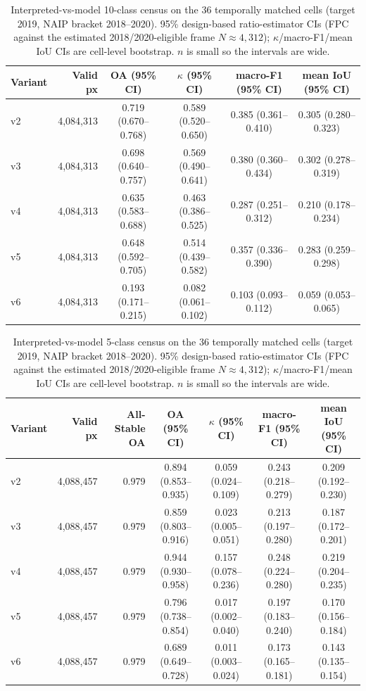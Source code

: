 \begin{table}[t]
\centering
\caption{Interpreted-vs-model 10-class census on the 36 temporally matched cells (target 2019, NAIP bracket 2018--2020). 95\% design-based ratio-estimator CIs (FPC against the estimated 2018/2020-eligible frame $N\approx4{,}312$); $\kappa$/macro-F1/mean IoU CIs are cell-level bootstrap. $n$ is small so the intervals are wide.}
\label{tab:model2019_10class}
\begin{tabular}{lrcccc}
\toprule
Variant & Valid px & OA (95\% CI) & $\kappa$ (95\% CI) & macro-F1 (95\% CI) & mean IoU (95\% CI) \\
\midrule
v2 & 4,084,313 & 0.719 (0.670--0.768) & 0.589 (0.520--0.650) & 0.385 (0.361--0.410) & 0.305 (0.280--0.323) \\
v3 & 4,084,313 & 0.698 (0.640--0.757) & 0.569 (0.490--0.641) & 0.380 (0.360--0.434) & 0.302 (0.278--0.319) \\
v4 & 4,084,313 & 0.635 (0.583--0.688) & 0.463 (0.386--0.525) & 0.287 (0.251--0.312) & 0.210 (0.178--0.234) \\
v5 & 4,084,313 & 0.648 (0.592--0.705) & 0.514 (0.439--0.582) & 0.357 (0.336--0.390) & 0.283 (0.259--0.298) \\
v6 & 4,084,313 & 0.193 (0.171--0.215) & 0.082 (0.061--0.102) & 0.103 (0.093--0.112) & 0.059 (0.053--0.065) \\
\bottomrule
\end{tabular}
\end{table}

\begin{table}[t]
\centering
\caption{Interpreted-vs-model 5-class census on the 36 temporally matched cells (target 2019, NAIP bracket 2018--2020). 95\% design-based ratio-estimator CIs (FPC against the estimated 2018/2020-eligible frame $N\approx4{,}312$); $\kappa$/macro-F1/mean IoU CIs are cell-level bootstrap. $n$ is small so the intervals are wide.}
\label{tab:model2019_5class}
\begin{tabular}{lrrcccc}
\toprule
Variant & Valid px & All-Stable OA & OA (95\% CI) & $\kappa$ (95\% CI) & macro-F1 (95\% CI) & mean IoU (95\% CI) \\
\midrule
v2 & 4,088,457 & 0.979 & 0.894 (0.853--0.935) & 0.059 (0.024--0.109) & 0.243 (0.218--0.279) & 0.209 (0.192--0.230) \\
v3 & 4,088,457 & 0.979 & 0.859 (0.803--0.916) & 0.023 (0.005--0.051) & 0.213 (0.197--0.280) & 0.187 (0.172--0.201) \\
v4 & 4,088,457 & 0.979 & 0.944 (0.930--0.958) & 0.157 (0.078--0.236) & 0.248 (0.224--0.280) & 0.219 (0.204--0.235) \\
v5 & 4,088,457 & 0.979 & 0.796 (0.738--0.854) & 0.017 (0.002--0.040) & 0.197 (0.183--0.240) & 0.170 (0.156--0.184) \\
v6 & 4,088,457 & 0.979 & 0.689 (0.649--0.728) & 0.011 (0.003--0.024) & 0.173 (0.165--0.181) & 0.143 (0.135--0.154) \\
\bottomrule
\end{tabular}
\end{table}
